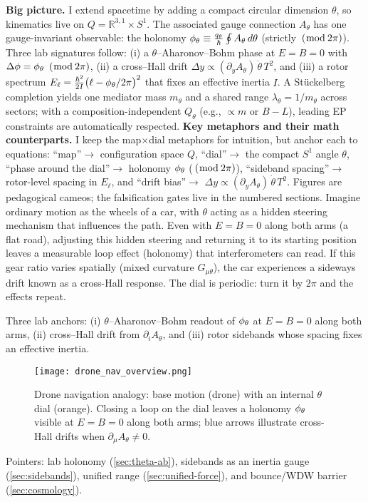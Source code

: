 \noindent\textbf{Big picture.} I extend spacetime by adding a compact circular dimension $\theta$, so kinematics live on $Q=\mathbb{R}^{3,1}\times S^1$. The associated gauge connection $A_\theta$ has one gauge\nobreakdash-invariant observable: the holonomy $\phi_\theta\equiv \frac{q_\theta}{\hbar}\oint A_\theta\,d\theta$ (strictly $\,(\bmod\,2\pi)$). Three lab signatures follow: (i) a $\theta$–Aharonov–Bohm phase at $E=B=0$ with $\Delta\phi=\phi_\theta\ \,(\bmod\,2\pi)$, (ii) a cross–Hall drift $\Delta y\propto(\partial_yA_\theta)\,\dot\theta\,T^2$, and (iii) a rotor spectrum $E_\ell=\frac{\hbar^2}{2I}\bigl(\ell-\phi_\theta/2\pi\bigr)^2$ that fixes an effective inertia $I$. A St\"uckelberg completion yields one mediator mass $m_\theta$ and a shared range $\lambda_\theta=1/m_\theta$ across sectors; with a composition-independent $Q_\theta$ (e.g., $\propto m$ or $B\!\!-
\!L$), leading EP constraints are automatically respected.
\noindent\textbf{Key metaphors and their math counterparts.} I keep the map$\times$dial metaphors for intuition, but anchor each to equations: “map”$\to$ configuration space $Q$, “dial”$\to$ the compact $S^1$ angle $\theta$, “phase around the dial”$\to$ holonomy $\phi_\theta$ ($\,(\bmod\,2\pi)$), “sideband spacing”$\to$ rotor-level spacing in $E_\ell$, and “drift bias”$\to$ $\Delta y\propto (\partial_y A_\theta)\,\dot\theta\,T^2$. Figures are pedagogical cameos; the falsification gates live in the numbered sections.
Imagine ordinary motion as the wheels of a car, with $\theta$ acting as a hidden steering mechanism that influences the path. Even with $E=B=0$ along both arms (a flat road), adjusting this hidden steering and returning it to its starting position leaves a measurable loop effect (holonomy) that interferometers can read. If this gear ratio varies spatially (mixed curvature $G_{\mu\theta}$), the car experiences a sideways drift known as a cross\nobreakdash-Hall response. The dial is periodic: turn it by $2\pi$ and the effects repeat.

Three lab anchors: (i) $\theta$–Aharonov–Bohm readout of $\phi_\theta$ at $E=B=0$ along both arms, (ii) cross–Hall drift from $\partial_i A_\theta$, and (iii) rotor sidebands whose spacing fixes an effective inertia.

\begin{figure}[htbp]
  \centering
  \texttt{[image: drone\_nav\_overview.png]}
	\caption{Drone navigation analogy: base motion (drone) with an internal $\theta$ dial (orange). Closing a loop on the dial leaves a holonomy $\phi_\theta$ visible at $E=B=0$ along both arms; blue arrows illustrate cross-Hall drifts when $\partial_\mu A_\theta\neq 0$.\label{fig:drone-analogy}}
\end{figure}

Pointers: lab holonomy (\cref{sec:theta-ab}), sidebands as an inertia gauge (\cref{sec:sidebands}), unified range (\cref{sec:unified-force}), and bounce/WDW barrier (\cref{sec:cosmology}).

